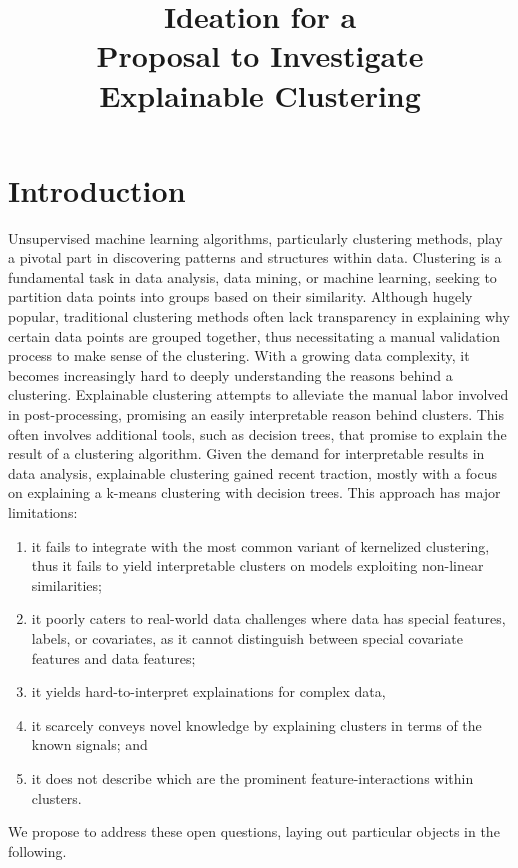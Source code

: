 \documentclass[10pt,a4paper]{article}
\title{Ideation for a\\Proposal to Investigate\\ Explainable Clustering}
\begin{document}
\maketitle

\section{Introduction}

Unsupervised machine learning algorithms, particularly clustering methods, play a pivotal part in discovering patterns and structures within data. 
Clustering is a fundamental task in data analysis, data mining, or machine learning, seeking to partition data points into groups based on their similarity.
Although hugely popular, traditional clustering methods often lack transparency in explaining why certain data points are grouped together, thus necessitating a manual validation process to make sense of the clustering. 
With a growing data complexity, it becomes increasingly hard to deeply understanding the reasons behind a clustering.
Explainable clustering attempts to alleviate the manual labor involved in post-processing, promising an easily interpretable reason behind clusters.
This often involves additional tools, such as decision trees, that promise to explain the result of a clustering algorithm.
Given the demand for interpretable results in data analysis, explainable clustering gained recent traction, mostly with a focus on explaining a k-means clustering with decision trees.
This approach has major limitations: 
\begin{enumerate}
\item it fails to integrate with the most common variant of kernelized clustering, thus it fails to yield interpretable clusters on models exploiting non-linear similarities;   
\item it poorly caters to real-world data challenges where data has special features, labels, or covariates, as it cannot distinguish between special covariate features and data features;
\item it yields hard-to-interpret explainations for complex data,
\item it scarcely conveys novel knowledge by explaining clusters in terms of the known signals; and 
\item it does not describe which are the prominent feature-interactions within clusters.  
\end{enumerate}
We propose to address these open questions, laying out particular objects in the following.
\end{document}
